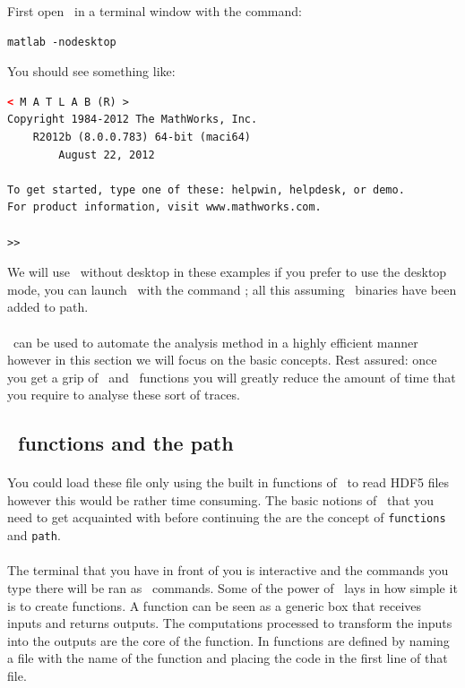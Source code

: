 First open \matlab\ in a terminal window with the command: 
\begin{lstlisting} 
matlab -nodesktop 
\end{lstlisting}

You should see something like:
\begin{lstlisting}[numbers=none,language=xml]
		< M A T L A B (R) >
Copyright 1984-2012 The MathWorks, Inc.
	R2012b (8.0.0.783) 64-bit (maci64)
		August 22, 2012

To get started, type one of these: helpwin, helpdesk, or demo.
For product information, visit www.mathworks.com.
 
>> 
\end{lstlisting}

We will use \matlab\ without desktop in these examples if you prefer
to use the desktop mode, you can launch \matlab\ with the command
; all this assuming \matlab\ binaries have been
added to path.

\paragraph{}
\matlab\ can be used to automate the analysis method in a highly
efficient manner however in this section we will focus on the basic
concepts. Rest assured: once you get a grip of \matlab\ and \matlab\
functions you will greatly reduce the amount of time that you require
to analyse these sort of traces.

\subsection{\matlab\ functions and the path}
\paragraph{}
You could load these file only using the built in functions of
\matlab\ to read HDF5 files however this would be rather time
consuming. The basic notions of \matlab\ that you need to get
acquainted with before continuing the are the concept of
\texttt{functions} and \texttt{path}.
\paragraph{}
The terminal that you have in front of you is interactive and the
commands you type there will be ran as \matlab\ commands. Some of the
power of \matlab\ lays in how simple it is to create functions. A
function can be seen as a generic box that receives inputs and returns
outputs. The computations processed to transform the inputs into the
outputs are the core of the function. In \matlab functions are defined
by naming a file with the name of the function and placing the code
\inlineCode{function [out] = functionName(in)} in the first line of
that file.

